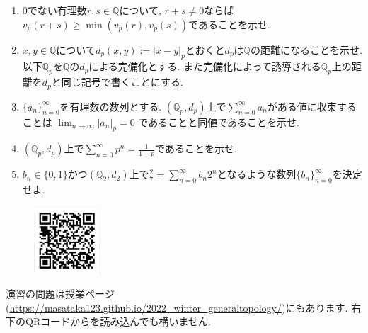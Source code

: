 \documentclass[dvipdfmx,a4paper,11pt]{article}
\newcommand{\Q}{\mathbb{Q}}
\theoremstyle{definition}
\begin{document}
\begin{enumerate}[label=\textbf{問}10.\arabic*]
\begin{enumerate}
\setlength{\parskip}{0cm}
  \setlength{\itemsep}{2pt} 
\item 0でない有理数$r,s \in \Q$について, $r+s \neq 0$ならば$v_{p}(r+s) \ge \min(v_{p}(r), v_{p}(s))$であることを示せ.
\item $x,y \in \Q$について$d_{p}(x,y) :=|x-y|_{p} $とおくと$d_{p}$は$\Q$の距離になることを示せ.
以下$\Q_p$を$\Q$の$d_{p}$による完備化とする. また完備化によって誘導される$\Q_p$上の距離を$d_{p}$と同じ記号で書くことにする.
\item $\{ a_{n}\}_{n=0}^{\infty}$を有理数の数列とする. $(\Q_p,d_{p})$上で$\sum_{n=0}^{\infty} a_n$がある値に収束することは
$\lim_{n \rightarrow \infty}|a_n|_{p} = 0$ であることと同値であることを示せ.
\item $(\Q_p,d_{p})$上で$\sum_{n=0}^{\infty} p^n = \frac{1}{1-p}$であることを示せ. %
\item $b_n \in \{0,1\}$かつ$(\Q_2,d_{2})$上で$\frac{2}{7} = \sum_{n=0}^{\infty} b_n 2^n$となるような数列$\{b_n\}_{n=0}^{\infty}$を決定せよ.
\end{enumerate}


 \end{enumerate}
 
  \vspace{11pt}
\begin{figure}
  \centering
 \includegraphics[height=25mm, width=25mm]{genetopo.png}
\end{figure}


演習の問題は授業ページ(\url{https://masataka123.github.io/2022_winter_generaltopology/})にもあります. 
右下のQRコードからを読み込んでも構いません.
 
 
 
\end{document}
